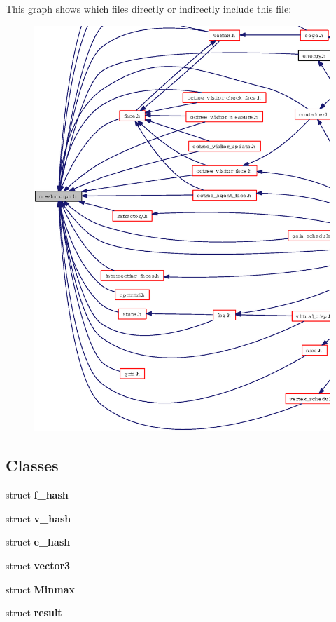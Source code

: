 This graph shows which files directly or indirectly include this file:\begin{figure}[H]
\begin{center}
\leavevmode
\includegraphics[width=376pt]{meshmorph_8h__dep__incl}
\end{center}
\end{figure}
\subsection*{Classes}
\begin{CompactItemize}
\item 
struct {\bf f\_\-hash}
\item 
struct {\bf v\_\-hash}
\item 
struct {\bf e\_\-hash}
\item 
struct {\bf vector3}
\item 
struct {\bf Minmax}
\item 
struct {\bf result}
\end{CompactItemize}
